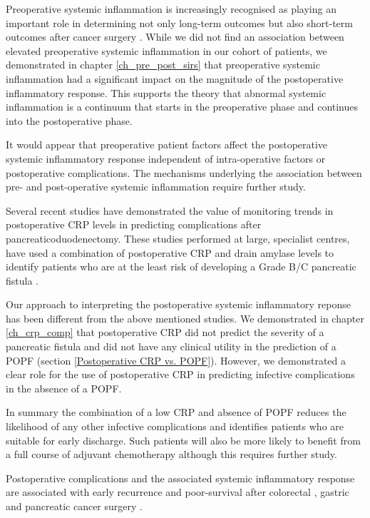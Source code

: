 Preoperative systemic inflammation is increasingly recognised as playing an important role in determining not only long-term outcomes but also short-term outcomes after cancer surgery \parencite{kubo_elevated_2013, mohri_correlation_2014, moyes_preoperative_2009, neal_preoperative_2011, vashist_glasgow_2010,  haupt_association_1997}.
While we did not find an association between elevated preoperative systemic inflammation in our cohort of patients, we demonstrated in chapter \ref{ch_pre_post_sirs} that preoperative systemic inflammation had a significant impact on  the magnitude of the postoperative inflammatory response.
This supports the theory that abnormal systemic inflammation is a continuum that starts in the preoperative phase and continues into the postoperative phase.

It would appear that preoperative patient factors affect the postoperative systemic inflammatory response independent of intra-operative factors or postoperative complications. 
The mechanisms underlying the association between pre- and post-operative systemic inflammation require further study.

Several recent studies have demonstrated the value of monitoring trends in postoperative CRP levels in predicting complications after pancreaticoduodenectomy.
These studies performed at large, specialist centres, have used a combination of postoperative CRP and drain amylase levels to identify patients who are at the least risk of developing a Grade B/C pancreatic fistula \parencite{hiyoshi_usefulness_2013, ansorge_diagnostic_2014, kosaka_multivariate_2014}.

Our approach to interpreting the postoperative systemic inflammatory reponse has been different from the above mentioned studies. 
We demonstrated in chapter \ref{ch_crp_comp} that postoperative CRP did not predict the severity of a pancreatic fistula and did not have any clinical utility in the prediction of a POPF (section \ref{Postoperative CRP vs. POPF}).
However, we demonstrated a clear role for the use of postoperative CRP in predicting infective complications in the absence of a POPF. 

In summary the combination of a low CRP and absence of POPF reduces the likelihood of any other infective complications and identifies patients who are suitable for early discharge.
Such patients will also be more likely to benefit from a full course of adjuvant chemotherapy although this requires further study.

Postoperative complications and the associated systemic inflammatory response are associated with early recurrence and poor-survival after colorectal \parencite{artinyan_infectious_2015, mcardle_impact_2005}, gastric \parencite{hayashi_impact_2015,kubota_prognostic_2014}  and pancreatic cancer surgery \parencite{aoyama_impact_2015, kamphues_postoperative_2012}.



